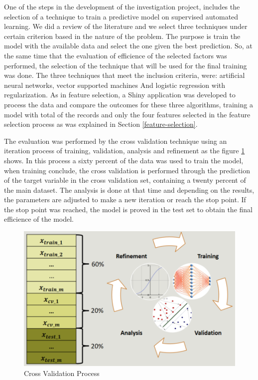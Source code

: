 \documentclass[]{book}
\begin{document}
One of the steps in the development of the investigation project,
includes the selection of a technique to train a predictive model on
supervised automated learning. We did a review of the literature and we
select three techniques under certain criterion based in the nature of
the problem. The purpose is train the model with the available data and
select the one given the best prediction. So, at the same time that the
evaluation of efficience of the selected factors was performed, the
selection of the technique that will be used for the final training was
done. The three techniques that meet the inclusion criteria, were:
artificial neural networks, vector supported machines And logistic
regression with regularization. As in feature selection, a Shiny
application was developed to process the data and compare the outcomes
for these three algorithms, training a model with total of the records
and only the four features selected in the feature selection process as
was explained in Section \ref{feature-selection}.

The evaluation was performed by the cross validation technique using an
iteration process of training, validation, analysis and refinement as
the figure \ref{fig:cross-validation-process} shows. In this process a
sixty percent of the data was used to train the model, when training
conclude, the cross validation is performed through the prediction of
the target variable in the cross validation set, containing a twenty
percent of the main dataset. The analysis is done at that time and
depending on the results, the parameters are adjusted to make a new
iteration or reach the stop point. If the stop point was reached, the
model is proved in the test set to obtain the final efficience of the
model.

\begin{figure}[H]

{\centering \includegraphics[width=0.8\linewidth]{images/cross-validation-process} 

}

\caption{Cross Validation Process}\label{fig:cross-validation-process}
\end{figure}
\end{document}
